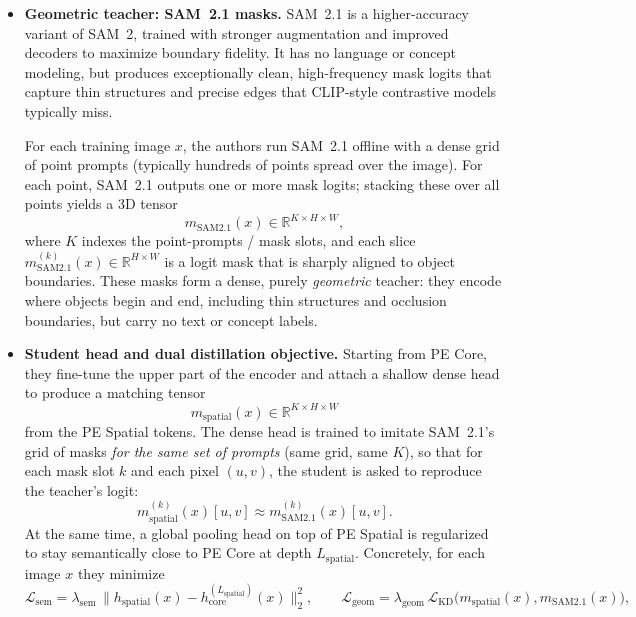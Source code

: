 \begin{enrichment}
\begin{enrichment}
\begin{itemize}
			\item \textbf{Geometric teacher: SAM~2.1 masks.}
			SAM~2.1 is a higher-accuracy variant of SAM~2, trained with stronger augmentation and improved decoders to maximize boundary fidelity. It has no language or concept modeling, but produces exceptionally clean, high-frequency mask logits that capture thin structures and precise edges that CLIP-style contrastive models typically miss.
			
			For each training image \(x\), the authors run SAM~2.1 offline with a dense grid of point prompts (typically hundreds of points spread over the image). For each point, SAM~2.1 outputs one or more mask logits; stacking these over all points yields a 3D tensor
			\[
			m_{\text{SAM2.1}}(x) \in \mathbb{R}^{K \times H \times W},
			\]
			where \(K\) indexes the point-prompts / mask slots, and each slice \(m_{\text{SAM2.1}}^{(k)}(x) \in \mathbb{R}^{H \times W}\) is a logit mask that is sharply aligned to object boundaries. These masks form a dense, purely \emph{geometric} teacher: they encode where objects begin and end, including thin structures and occlusion boundaries, but carry no text or concept labels.
			
			\item \textbf{Student head and dual distillation objective.}
			Starting from PE Core, they fine-tune the upper part of the encoder and attach a shallow dense head to produce a matching tensor
			\[
			m_{\text{spatial}}(x) \in \mathbb{R}^{K \times H \times W}
			\]
			from the PE Spatial tokens. The dense head is trained to imitate SAM~2.1’s grid of masks \emph{for the same set of prompts} (same grid, same \(K\)), so that for each mask slot \(k\) and each pixel \((u,v)\), the student is asked to reproduce the teacher’s logit:
			\[
			m_{\text{spatial}}^{(k)}(x)[u,v] \approx m_{\text{SAM2.1}}^{(k)}(x)[u,v].
			\]
			At the same time, a global pooling head on top of PE Spatial is regularized to stay semantically close to PE Core at depth \(L_{\text{spatial}}\). Concretely, for each image \(x\) they minimize
			\[
			\mathcal{L}_{\text{sem}} = \lambda_{\text{sem}} \,\bigl\| h_{\text{spatial}}(x) - h_{\text{core}}^{(L_{\text{spatial}})}(x) \bigr\|_2^2,
			\qquad
			\mathcal{L}_{\text{geom}} = \lambda_{\text{geom}} \,\mathcal{L}_{\text{KD}}\bigl(m_{\text{spatial}}(x), m_{\text{SAM2.1}}(x)\bigr),
			\]
			
			\newpage
			

\end{itemize}
\end{enrichment}
\end{enrichment}
